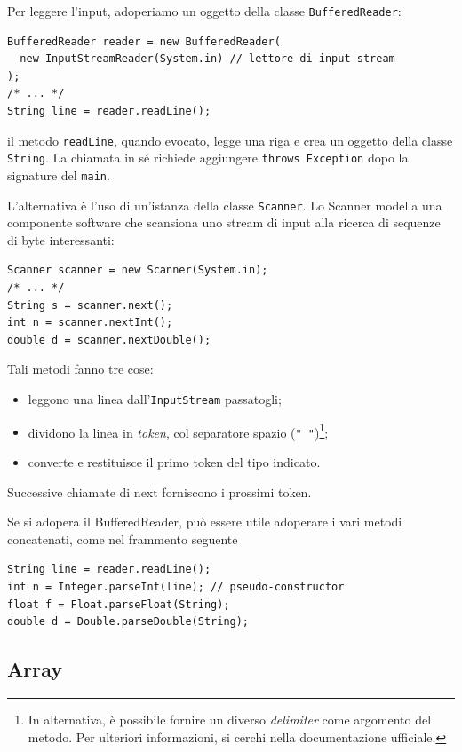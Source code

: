 \documentclass[\fontsizeclass,twocolumn]{\classname}
\theoremstyle{definition}
\theoremstyle{definition}
\begin{document}
Per leggere l'input, adoperiamo un oggetto della classe \texttt{BufferedReader}:

\begin{lstlisting}
BufferedReader reader = new BufferedReader(
  new InputStreamReader(System.in) // lettore di input stream
);
/* ... */
String line = reader.readLine();
\end{lstlisting}

il metodo \texttt{readLine}, quando evocato, legge una riga e crea un oggetto
della classe \texttt{String}. La chiamata in sé richiede aggiungere
\texttt{throws Exception} dopo la signature del \texttt{main}.

L'alternativa è l'uso di un'istanza della classe \texttt{Scanner}. Lo Scanner
modella una componente software che scansiona uno stream di input alla ricerca
di sequenze di byte interessanti:

\begin{lstlisting}
Scanner scanner = new Scanner(System.in);
/* ... */
String s = scanner.next();
int n = scanner.nextInt();
double d = scanner.nextDouble();
\end{lstlisting}

Tali metodi fanno tre cose:
\begin{itemize}
    \item leggono una linea dall'\texttt{Input\-Stream} passatogli;
    \item dividono la linea in \emph{token}, col separatore spazio (\texttt{"
        "})\footnote{In alternativa, è possibile fornire un diverso
        \emph{delimiter} come argomento del metodo. Per ulteriori informazioni,
    si cerchi nella documentazione ufficiale.};
    \item converte e restituisce il primo token del tipo indicato.
\end{itemize}
Successive chiamate di next forniscono i prossimi token.

Se si adopera il BufferedReader, può essere utile adoperare i vari metodi
concatenati, come nel frammento seguente

\begin{lstlisting}
String line = reader.readLine();
int n = Integer.parseInt(line); // pseudo-constructor
float f = Float.parseFloat(String);
double d = Double.parseDouble(String);
\end{lstlisting}

\subsection{Array}
\end{document}
